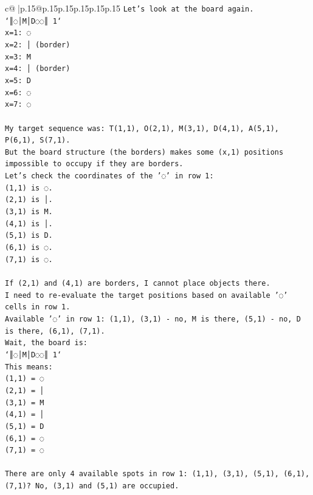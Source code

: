\documentclass{article}
\begin{document}
{\begin{supertabular}{c@{$\;$}|p{.15\linewidth}@{}p{.15\linewidth}p{.15\linewidth}p{.15\linewidth}p{.15\linewidth}p{.15\linewidth}}
{{{\texttt{Let's look at the board again.} \\
\texttt{`║◌│M│D◌◌║ 1`} \\
\texttt{x=1: ◌} \\
\texttt{x=2: │ (border)} \\
\texttt{x=3: M} \\
\texttt{x=4: │ (border)} \\
\texttt{x=5: D} \\
\texttt{x=6: ◌} \\
\texttt{x=7: ◌} \\
\\ 
\texttt{My target sequence was: T(1,1), O(2,1), M(3,1), D(4,1), A(5,1), P(6,1), S(7,1).} \\
\texttt{But the board structure (the borders) makes some (x,1) positions impossible to occupy if they are borders.} \\
\texttt{Let's check the coordinates of the '◌' in row 1:} \\
\texttt{(1,1) is ◌.} \\
\texttt{(2,1) is │.} \\
\texttt{(3,1) is M.} \\
\texttt{(4,1) is │.} \\
\texttt{(5,1) is D.} \\
\texttt{(6,1) is ◌.} \\
\texttt{(7,1) is ◌.} \\
\\ 
\texttt{If (2,1) and (4,1) are borders, I cannot place objects there.} \\
\texttt{I need to re{-}evaluate the target positions based on available '◌' cells in row 1.} \\
\texttt{Available '◌' in row 1: (1,1), (3,1) {-} no, M is there, (5,1) {-} no, D is there, (6,1), (7,1).} \\
\texttt{Wait, the board is:} \\
\texttt{`║◌│M│D◌◌║ 1`} \\
\texttt{This means:} \\
\texttt{(1,1) = ◌} \\
\texttt{(2,1) = │} \\
\texttt{(3,1) = M} \\
\texttt{(4,1) = │} \\
\texttt{(5,1) = D} \\
\texttt{(6,1) = ◌} \\
\texttt{(7,1) = ◌} \\
\\ 
\texttt{There are only 4 available spots in row 1: (1,1), (3,1), (5,1), (6,1), (7,1)? No, (3,1) and (5,1) are occupied.} \\
}}}
\end{supertabular}}
\end{document}

